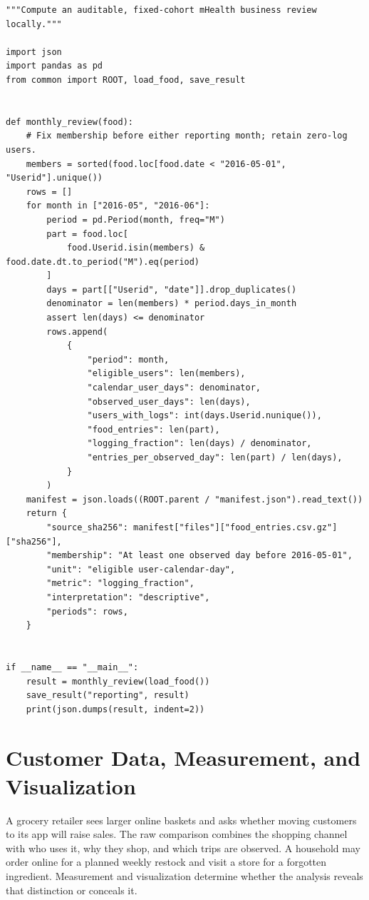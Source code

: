 \begin{Verbatim}[breaklines,breakanywhere,fontsize=\small]
"""Compute an auditable, fixed-cohort mHealth business review locally."""

import json
import pandas as pd
from common import ROOT, load_food, save_result


def monthly_review(food):
    # Fix membership before either reporting month; retain zero-log users.
    members = sorted(food.loc[food.date < "2016-05-01", "Userid"].unique())
    rows = []
    for month in ["2016-05", "2016-06"]:
        period = pd.Period(month, freq="M")
        part = food.loc[
            food.Userid.isin(members) & food.date.dt.to_period("M").eq(period)
        ]
        days = part[["Userid", "date"]].drop_duplicates()
        denominator = len(members) * period.days_in_month
        assert len(days) <= denominator
        rows.append(
            {
                "period": month,
                "eligible_users": len(members),
                "calendar_user_days": denominator,
                "observed_user_days": len(days),
                "users_with_logs": int(days.Userid.nunique()),
                "food_entries": len(part),
                "logging_fraction": len(days) / denominator,
                "entries_per_observed_day": len(part) / len(days),
            }
        )
    manifest = json.loads((ROOT.parent / "manifest.json").read_text())
    return {
        "source_sha256": manifest["files"]["food_entries.csv.gz"]["sha256"],
        "membership": "At least one observed day before 2016-05-01",
        "unit": "eligible user-calendar-day",
        "metric": "logging_fraction",
        "interpretation": "descriptive",
        "periods": rows,
    }


if __name__ == "__main__":
    result = monthly_review(load_food())
    save_result("reporting", result)
    print(json.dumps(result, indent=2))
\end{Verbatim}

\hypertarget{M02-m2.-customer-data-measurement-and-visualization}{%
\chapter{Customer Data, Measurement, and
Visualization}\label{M02-m2.-customer-data-measurement-and-visualization}}

\noindent A grocery retailer sees larger online baskets and asks whether moving
customers to its app will raise sales. The raw comparison combines the
shopping channel with who uses it, why they shop, and which trips are
observed. A household may order online for a planned weekly restock and
visit a store for a forgotten ingredient. Measurement and visualization
determine whether the analysis reveals that distinction or conceals it.

